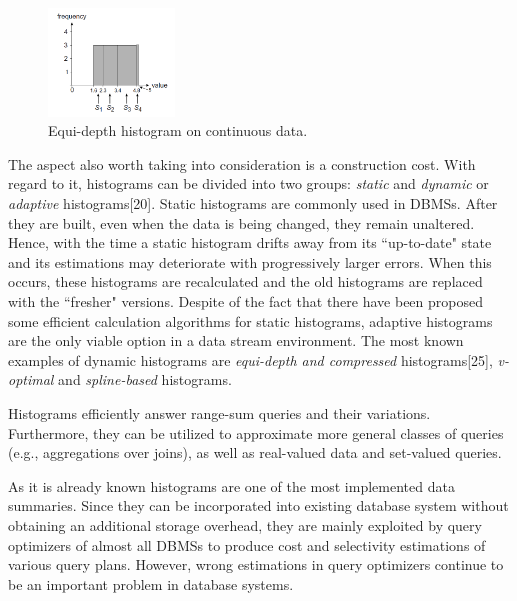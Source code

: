 \documentclass[10pt, conference, compsocconf]{IEEEtran}
\begin{document}
\label{fig:equi-depth_histograms}
\begin{figure} \includegraphics[width=0.3\textwidth, center]{img/equi-depth_histogram.png} 
\caption[Equi-depth histogram on continuous data.]%
{Equi-depth histogram on continuous data.\footnotemark}
\end{figure}

The aspect also worth taking into consideration is a construction cost. With regard to it, histograms can be divided into two groups: \textit{static} and \textit{dynamic} or \textit{adaptive} histograms[20]. Static histograms are commonly used in DBMSs. After they are built, even when the data is being changed, they remain unaltered. Hence, with the time a static histogram drifts away from its ``up-to-date" state and its estimations may deteriorate with progressively larger errors. When this occurs, these histograms are recalculated and the old histograms are replaced with the ``fresher" versions. 
Despite of the fact that there have been proposed some efficient calculation algorithms for static histograms, adaptive histograms are the only viable option in a data stream environment. The most known examples of dynamic histograms are \textit{equi-depth and compressed} histograms[25], \textit{v-optimal} and \textit{spline-based} histograms. 

Histograms efficiently answer range-sum queries and their variations. Furthermore, they can be utilized to approximate more general classes of queries (e.g., aggregations over joins), as well as real-valued data and set-valued queries.
  
As it is already known histograms are one of the most implemented data summaries. Since they can be incorporated into existing database system without obtaining an additional storage overhead, they are mainly exploited by query optimizers of almost all DBMSs to produce cost and selectivity estimations of various query plans. However, wrong estimations in query optimizers continue to be an important problem in database systems.\\
\end{document}

